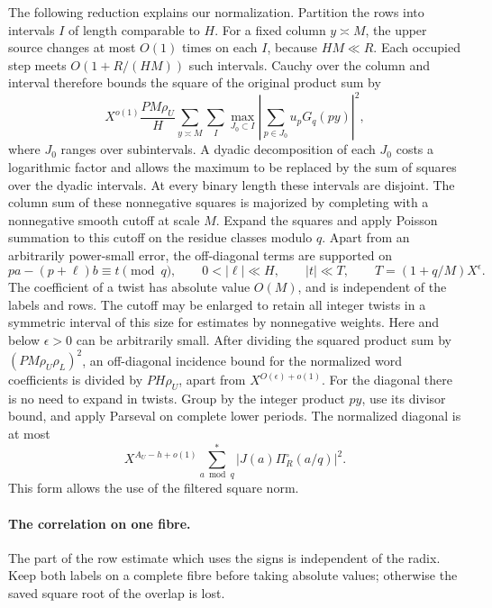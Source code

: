 \documentclass[11pt,a4paper]{article}
\theoremstyle{paperplain}
\numberwithin{equation}{section}
\begin{document}
The following reduction explains our normalization. Partition the
rows into intervals \(I\) of length comparable to \(H\).
For a fixed column \(y\asymp M\), the upper source changes
at most \(O(1)\) times on each \(I\), because \(HM\ll R\).
Each occupied step meets \(O(1+R/(HM))\) such intervals.
Cauchy over the column and interval therefore bounds the
square of the original product sum by
\[
 X^{o(1)}\frac{PM\rho_U}{H}
   \sum_{y\asymp M}\sum_I
       \max_{J_0\subset I}
       \left|\sum_{p\in J_0}u_pG_q(py)\right|^2 ,
\]
where \(J_0\) ranges over subintervals. A dyadic decomposition of
each \(J_0\) costs a logarithmic factor and allows the maximum
to be replaced by the sum of squares over the dyadic intervals.
At every binary length these intervals are disjoint. The column
sum of these nonnegative squares is majorized by completing with
a nonnegative smooth cutoff at scale \(M\). Expand the squares
and apply Poisson summation to this cutoff on the residue classes
modulo \(q\). Apart from an arbitrarily power-small error, the
off-diagonal terms are supported on
\begin{equation}
 p a-(p+\ell)b\equiv t\pmod q,\qquad
      0<|\ell|\ll H,\qquad |t|\ll T,\qquad
      T=(1+q/M)X^\epsilon .
 \label{dt:gram-incidence}
\end{equation}
The coefficient of a twist has absolute value \(O(M)\), and is
independent of the labels and rows. The cutoff may be enlarged
to retain all integer twists in a symmetric interval of this
size for estimates by nonnegative weights. Here and below
\(\epsilon>0\) can be arbitrarily small. After dividing the
squared product sum by \((PM\rho_U\rho_L)^2\), an off-diagonal
incidence bound for the normalized word coefficients is divided
by \(PH\rho_U\), apart from \(X^{O(\epsilon)+o(1)}\).
For the diagonal there is no need to expand in twists.
Group by the integer product \(py\), use its divisor bound,
and apply Parseval on complete lower periods. The normalized
diagonal is at most
\begin{equation}
 X^{A_U-h+o(1)}
              \sum_{a\bmod q}^{*}|J(a)\Pi_R^\circ(a/q)|^2 .
 \label{dt:gram-diagonal}
\end{equation}
This form allows the use of the filtered square norm.

\paragraph{The correlation on one fibre.}
The part of the row estimate which uses the signs is independent of
the radix. Keep both labels on a complete fibre before taking absolute
values; otherwise the saved square root of the overlap is lost.
\end{document}
